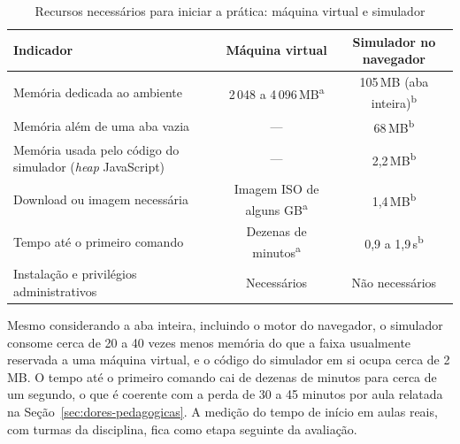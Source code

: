 \begin{table}[htbp]
    \centering
    \caption{Recursos necessários para iniciar a prática: máquina virtual e simulador}
    \label{tab:comparativo-recursos}
    \footnotesize
    \begin{tabular}{p{5.6cm}cc}
        \toprule
        \textbf{Indicador} & \textbf{Máquina virtual} & \textbf{Simulador no navegador} \\
        \midrule
        Memória dedicada ao ambiente & 2\,048 a 4\,096\,MB\textsuperscript{a} & 105\,MB (aba inteira)\textsuperscript{b} \\
        Memória além de uma aba vazia & --- & 68\,MB\textsuperscript{b} \\
        Memória usada pelo código do simulador (\textit{heap} JavaScript) & --- & 2,2\,MB\textsuperscript{b} \\
        Download ou imagem necessária & Imagem ISO de alguns GB\textsuperscript{a} & 1,4\,MB\textsuperscript{b} \\
        Tempo até o primeiro comando & Dezenas de minutos\textsuperscript{a} & 0,9 a 1,9\,s\textsuperscript{b} \\
        Instalação e privilégios administrativos & Necessários & Não necessários \\
        \bottomrule
    \end{tabular}
\end{table}

Mesmo considerando a aba inteira, incluindo o motor do navegador, o simulador consome cerca de 20 a 40 vezes menos memória do que a faixa usualmente reservada a uma máquina virtual, e o código do simulador em si ocupa cerca de 2\,MB. O tempo até o primeiro comando cai de dezenas de minutos para cerca de um segundo, o que é coerente com a perda de 30 a 45 minutos por aula relatada na Seção~\ref{sec:dores-pedagogicas}. A medição do tempo de início em aulas reais, com turmas da disciplina, fica como etapa seguinte da avaliação.
